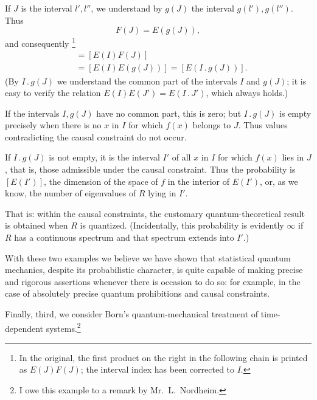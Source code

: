 \documentclass[fontsize=13pt,paper=b5,twoside,bookmarkpackage=false]{scrartcl}
\newcounter{translatornote}
\newcommand{\tnote}[1]{%
  \begingroup\stepcounter{translatornote}%
  \renewcommand{\thefootnote}{T\arabic{translatornote}}%
  \footnote[0]{#1}\endgroup}
\begin{document}
If $J$ is the interval $l',l''$, we understand by $g(J)$ the interval $g(l'),g(l'')$. Thus
\[
 F(J)=E(g(J)),
\]
and consequently\tnote{In the original, the first product on the right in the following chain is printed as $E(J)F(J)$; the interval index has been corrected to $I$.}
\begin{align*}
 [E(I),F(J)]&=[E(I)F(J)]\\
 &=[E(I)E(g(J))]=[E(I\mathbin{.}g(J))].
\end{align*}
(By $I\mathbin{.}g(J)$ we understand the common part of the intervals $I$ and $g(J)$; it is easy to verify the relation $E(I)E(J')=E(I\mathbin{.}J')$, which always holds.)

If the intervals $I,g(J)$ have no common part, this is zero; but $I\mathbin{.}g(J)$ is empty precisely when there is no $x$ in $I$ for which $f(x)$ belongs to $J$. Thus values contradicting the causal constraint do not occur.

If $I\mathbin{.}g(J)$ is not empty, it is the interval $I'$ of all $x$ in $I$ for which $f(x)$ lies in $J$, that is, those admissible under the causal constraint. Thus the probability is
$[E(I')]$, the dimension of the space of $f$ in the interior of $E(I')$, or, as we know, the number of eigenvalues of $R$ lying in $I'$.

That is: within the causal constraints, the customary quantum-theoretical result is obtained when $R$ is quantized. (Incidentally, this probability is evidently $\infty$ if $R$ has a continuous spectrum and that spectrum extends into $I'$.)

With these two examples we believe we have shown that statistical quantum mechanics, despite its probabilistic character, is quite capable of making precise and rigorous assertions whenever there is occasion to do so: for example, in the case of absolutely precise quantum prohibitions and causal constraints.

Finally, third, we consider Born's quantum-mechanical treatment of time-dependent systems.\footnote[35]{\label{fn:35}I owe this example to a remark by Mr.~L.~Nordheim.}
\end{document}
